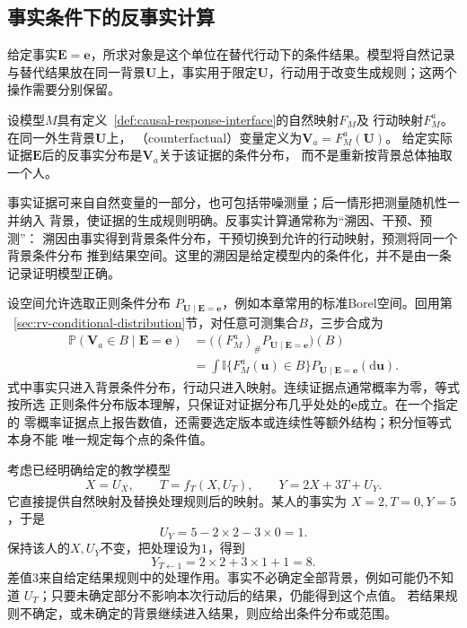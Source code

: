 \subsection{事实条件下的反事实计算}
\label{sec:causal-factual-counterfactual}

给定事实\(\bm E=\bm e\)，所求对象是这个单位在替代行动下的条件结果。模型将自然记录与替代结果放在同一背景\(\bm U\)上，事实用于限定\(\bm U\)，行动用于改变生成规则；这两个操作需要分别保留。

\begin{definition}[给定响应模型的反事实变量]
  \label{def:causal-counterfactual}
  设模型\(M\)具有定义~\ref{def:causal-response-interface}的自然映射\(F_M\)及
  行动映射\(F_M^a\)。在同一外生背景\(\bm U\)上，
  （counterfactual）变量定义为\(\bm V_a=F_M^a(\bm U)\)。
  给定实际证据\(\bm E\)后的反事实分布是\(\bm V_a\)关于该证据的条件分布，
  而不是重新按背景总体抽取一个人。
\end{definition}

事实证据可来自自然变量的一部分，也可包括带噪测量；后一情形把测量随机性一并纳入
背景，使证据的生成规则明确。反事实计算通常称为“溯因、干预、预测”：
溯因由事实得到背景条件分布，干预切换到允许的行动映射，预测将同一个背景条件分布
推到结果空间。这里的溯因是给定模型内的条件化，并不是由一条记录证明模型正确。

设空间允许选取正则条件分布
\(P_{\bm U\mid\bm E=\bm e}\)，例如本章常用的标准Borel空间。回用第
~\ref{sec:rv-conditional-distribution}节，对任意可测集合\(B\)，三步合成为
\begin{equation}
  \begin{aligned}
    \mathbb P(\bm V_a\in B\mid\bm E=\bm e)
    &=
    \bigl((F_M^a)_{\#}
      P_{\bm U\mid\bm E=\bm e}\bigr)(B)\\
    &=
    \int\mathbb I\{F_M^a(\bm u)\in B\}
      P_{\bm U\mid\bm E=\bm e}(\mathrm d\bm u).
  \end{aligned}
  \label{eq:causal-counterfactual-pushforward}
\end{equation}
式中事实只进入背景条件分布，行动只进入映射。连续证据点通常概率为零，等式按所选
正则条件分布版本理解，只保证对证据分布几乎处处的\(\bm e\)成立。在一个指定的
零概率证据点上报告数值，还需要选定版本或连续性等额外结构；积分恒等式本身不能
唯一规定每个点的条件值。

考虑已经明确给定的教学模型
\begin{equation}
  X=U_X,\qquad
  T=f_T(X,U_T),\qquad
  Y=2X+3T+U_Y.
  \label{eq:causal-counterfactual-linear-example}
\end{equation}
它直接提供自然映射及替换处理规则后的映射。某人的事实为
\(X=2,T=0,Y=5\)，于是
\[
  U_Y=5-2\times2-3\times0=1.
\]
保持该人的\(X,U_Y\)不变，把处理设为\(1\)，得到
\[
  Y_{T\leftarrow1}=2\times2+3\times1+1=8.
\]
差值\(3\)来自给定结果规则中的处理作用。事实不必确定全部背景，例如可能仍不知道
\(U_T\)；只要未确定部分不影响本次行动后的结果，仍能得到这个点值。
若结果规则不确定，或未确定的背景继续进入结果，则应给出条件分布或范围。


